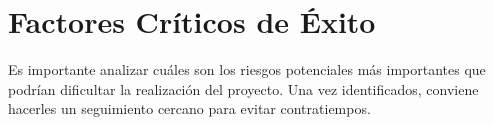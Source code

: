 \section{Factores Críticos de Éxito}
\color{blue}Es importante analizar cuáles son los riesgos potenciales más importantes que podrían dificultar la realización del proyecto. Una vez identificados, conviene hacerles un seguimiento cercano para evitar contratiempos.\color{black}
